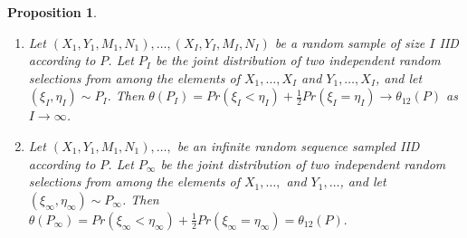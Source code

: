 \message{ !name(manuscript.tex)}\documentclass[12pt]{article}
\newcommand{\I}{I}
\renewcommand{\P}{P}
\newtheorem{proposition}[theorem]{Proposition}
\begin{document}
\begin{proposition}
  \begin{enumerate}
  \item Let $(X_1,Y_1,M_1,N_1),\ldots,(X_\I,Y_\I,M_\I,N_\I)$
    be a random sample of size $\I$ IID according to $\P$. Let $\P_\I$ be
    the joint distribution of two independent random selections from
    among the elements of $X_1,\ldots,X_\I$ and $Y_1,\ldots,X_\I$, and
    let $(\xi_\I,\eta_\I)\sim\P_\I$. Then
    $\theta(\P_\I)=Pr(\xi_\I<\eta_\I)+\frac{1}{2}Pr(\xi_I=\eta_I) \to \theta_{12}(\P)$
    as $\I\to\infty$.
  \item Let $(X_1,Y_1,M_1,N_1),\ldots,$
    be an infinite random sequence sampled IID according to $\P$. Let $\P_\infty$ be
    the joint distribution of two independent random selections from
    among the elements of $X_1,\ldots,$ and $Y_1,\ldots$, and
    let $(\xi_\infty,\eta_\infty)\sim\P_\infty$. Then
    $\theta(\P_\infty)=Pr(\xi_\infty<\eta_\infty)+\frac{1}{2}Pr(\xi_\infty=\eta_\infty)=\theta_{12}(\P).$    
  \end{enumerate}
\end{proposition}
\end{document}
